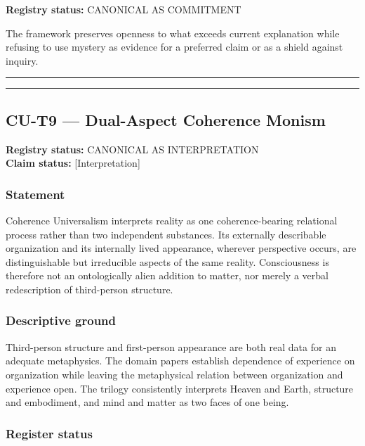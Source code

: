 \documentclass[
  11pt,
]{article}
\begin{document}
\textbf{Registry status:} CANONICAL AS COMMITMENT

The framework preserves openness to what exceeds current explanation
while refusing to use mystery as evidence for a preferred claim or as a
shield against inquiry.

\begin{center}\rule{0.5\linewidth}{0.5pt}\end{center}

\begin{center}\rule{0.5\linewidth}{0.5pt}\end{center}

\subsection{CU-T9 --- Dual-Aspect Coherence
Monism}\label{cu-t9-dual-aspect-coherence-monism}

\textbf{Registry status:} CANONICAL AS INTERPRETATION\\
\textbf{Claim status:} {[}Interpretation{]}

\subsubsection{Statement}\label{statement-58}

Coherence Universalism interprets reality as one coherence-bearing
relational process rather than two independent substances. Its
externally describable organization and its internally lived appearance,
wherever perspective occurs, are distinguishable but irreducible aspects
of the same reality. Consciousness is therefore not an ontologically
alien addition to matter, nor merely a verbal redescription of
third-person structure.

\subsubsection{Descriptive ground}\label{descriptive-ground}

Third-person structure and first-person appearance are both real data
for an adequate metaphysics. The domain papers establish dependence of
experience on organization while leaving the metaphysical relation
between organization and experience open. The trilogy consistently
interprets Heaven and Earth, structure and embodiment, and mind and
matter as two faces of one being.

\subsubsection{Register status}\label{register-status}
\end{document}
